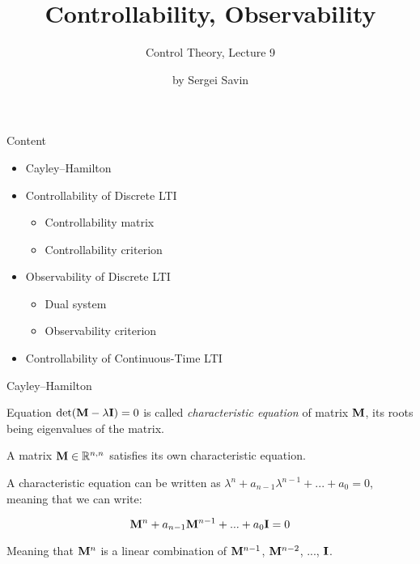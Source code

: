 \documentclass{beamer}
\title{Controllability, Observability}
\subtitle{Control Theory, Lecture 9}
\author{by Sergei Savin}
\date{\mydate}
\begin{document}
\maketitle


\begin{frame}{Content}
\begin{itemize}
\item Cayley–Hamilton
\item Controllability of Discrete LTI
\begin{itemize}
    \item Controllability matrix
    \item Controllability criterion
\end{itemize}
\item Observability of Discrete LTI
\begin{itemize}
    \item Dual system
    \item Observability criterion
\end{itemize}
\item Controllability of Continuous-Time LTI
\end{itemize}
\end{frame}





\begin{frame}{Cayley–Hamilton}
	\begin{flushleft}
		
		Equation $\text{det}(\mathbf{M} - \lambda\mathbf{I}) = 0$ is called \emph{characteristic equation} of matrix $\mathbf{M}$, its roots being eigenvalues of the matrix.
		
		\bigskip
		
		\begin{theorem}
			A matrix $\mathbf{M} \in \mathbb{R}^{n, n}$ satisfies its own characteristic equation.
		\end{theorem}
		
		A characteristic equation can be written as $\lambda^n + a_{n-1}\lambda^{n-1} + ... + a_0  = 0$, meaning that we can write:
		
		\begin{equation}
			\mathbf{M}^n + a_{n-1}\mathbf{M}^{n-1} + ... + a_0\mathbf{I}  = 0
		\end{equation}	
		
		Meaning that \textcolor{mydarkblue}{$\mathbf{M}^n$ is a linear combination of $\mathbf{M}^{n-1}$, $\mathbf{M}^{n-2}$, ..., $\mathbf{I}$}.
		
		
	\end{flushleft}
\end{frame}
\end{document}
